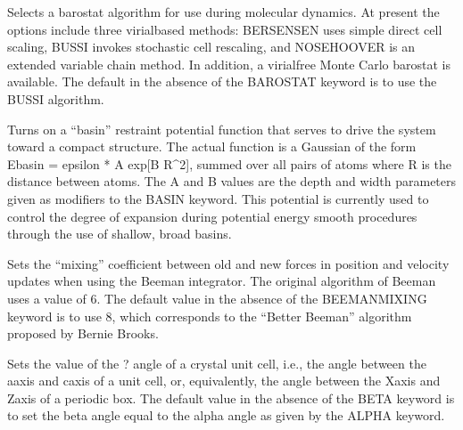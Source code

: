 \documentclass[letterpaper,11pt,english]{sphinxmanual}
\begin{document}
\ignorespaces {}\label{\detokenize{text/keywords:key-barostat}}\begin{description}
\sphinxAtStartPar
Selects a barostat algorithm for use during molecular dynamics. At present the options include three virial\sphinxhyphen{}based methods: BERSENSEN uses simple direct cell scaling, BUSSI invokes stochastic cell rescaling, and NOSE\sphinxhyphen{}HOOVER is an extended variable chain method. In addition, a virial\sphinxhyphen{}free Monte Carlo barostat is available. The default in the absence of the BAROSTAT keyword is to use the BUSSI algorithm.

\end{description}

\ignorespaces {}\label{\detokenize{text/keywords:key-basin}}\begin{description}
\sphinxAtStartPar
Turns on a “basin” restraint potential function that serves to drive the system toward a compact structure. The actual function is a Gaussian of the form Ebasin = epsilon * A exp{[}\sphinxhyphen{}B R\textasciicircum{}2{]}, summed over all pairs of atoms where R is the distance between atoms. The A and B values are the depth and width parameters given as modifiers to the BASIN keyword. This potential is currently used to control the degree of expansion during potential energy smooth procedures through the use of shallow, broad basins.

\end{description}

\ignorespaces {}\label{\detokenize{text/keywords:key-beeman-mixing}}\begin{description}
\sphinxAtStartPar
Sets the “mixing” coefficient between old and new forces in position and velocity updates when using the Beeman integrator. The original algorithm of Beeman uses a value of 6. The default value in the absence of the BEEMAN\sphinxhyphen{}MIXING keyword is to use 8, which corresponds to the “Better Beeman” algorithm proposed by Bernie Brooks.

\end{description}

\ignorespaces {}\label{\detokenize{text/keywords:key-beta}}\begin{description}
\sphinxAtStartPar
Sets the value of the ? angle of a crystal unit cell, i.e., the angle between the a\sphinxhyphen{}axis and c\sphinxhyphen{}axis of a unit cell, or, equivalently, the angle between the X\sphinxhyphen{}axis and Z\sphinxhyphen{}axis of a periodic box. The default value in the absence of the BETA keyword is to set the beta angle equal to the alpha angle as given by the ALPHA keyword.

\end{description}
\end{document}
